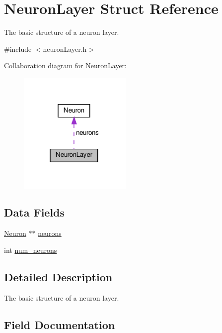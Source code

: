\hypertarget{structNeuronLayer}{}\section{Neuron\+Layer Struct Reference}
\label{structNeuronLayer}


The basic structure of a neuron layer.  




{\ttfamily \#include $<$neuron\+Layer.\+h$>$}



Collaboration diagram for Neuron\+Layer\+:\nopagebreak
\begin{figure}[H]
\begin{center}
\leavevmode
\includegraphics[width=154pt]{structNeuronLayer__coll__graph}
\end{center}
\end{figure}
\subsection*{Data Fields}
\begin{DoxyCompactItemize}
\item 
\hyperlink{structNeuron}{Neuron} $\ast$$\ast$ \hyperlink{structNeuronLayer_a784ca23934ab18af5f24e6b5388ab777}{neurons}
\item 
int \hyperlink{structNeuronLayer_a5f293e290fbfdde756fe43af034ec421}{num\+\_\+neurons}
\end{DoxyCompactItemize}


\subsection{Detailed Description}
The basic structure of a neuron layer. 

\subsection{Field Documentation}
\mbox{\label{structNeuronLayer_a784ca23934ab18af5f24e6b5388ab777}} 

